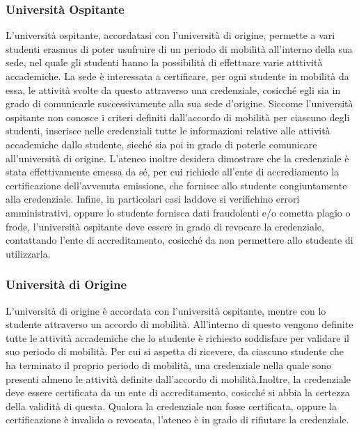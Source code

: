 \documentclass[a4paper,12pt]{article}
\begin{document}
\subsubsection{Università Ospitante}
L'università ospitante, accordatasi con l'università di origine, permette a vari studenti erasmus di poter usufruire di un periodo di mobilità all'interno della sua sede, nel quale gli studenti hanno la possibilità di effettuare varie atttività accademiche.
\newline La sede è interessata a certificare, per ogni studente in mobilità da essa, le attività svolte da questo attraverso una credenziale, cosicché egli sia in grado di comunicarle successivamente alla sua sede d'origine.
\newline Siccome l'università ospitante non conosce i criteri definiti dall'accordo di mobilità per ciascuno degli studenti, inserisce nelle credenziali tutte le informazioni relative alle attività accademiche dallo studente, sicché sia poi in grado di poterle comunicare all'università di origine.
\newline L'ateneo inoltre desidera dimostrare che la credenziale è stata effettivamente emessa da sé, per cui richiede all'ente di accrediamento la certificazione dell'avvenuta emissione, che fornisce allo studente congiuntamente alla credenziale.
\newline Infine, in particolari casi laddove si verifichino errori amministrativi, oppure lo studente fornisca dati fraudolenti e/o cometta plagio o frode, l'università ospitante deve essere in grado di revocare la credenziale, contattando l'ente di accreditamento, cosicché da non permettere allo studente di utilizzarla.

\subsubsection{Università di Origine}
L'università di origine è accordata con l'università ospitante, mentre con lo studente attraverso un accordo di mobilità. All'interno di questo vengono definite tutte le attività accademiche che lo studente è richiesto soddisfare per validare il suo periodo di mobilità. 
\newline Per cui si aspetta di ricevere, da ciascuno studente che ha terminato il proprio periodo di mobilità, una credenziale nella quale sono presenti almeno le attività definite dall'accordo di mobilità.\newline Inoltre, la credenziale deve essere certificata da un ente di accreditamento, cosicché si abbia la certezza della validità di questa. Qualora la credenziale non fosse certificata, oppure la certificazione è invalida o revocata, l'ateneo è in grado di rifiutare la credenziale.
\end{document}
